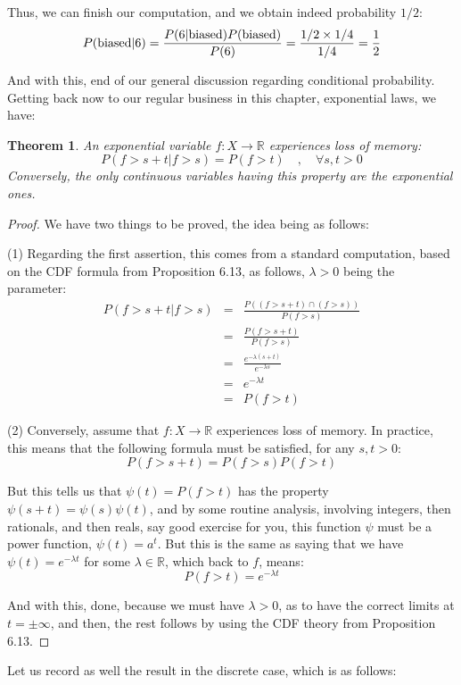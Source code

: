\documentclass[12pt]{amsbook}
\newtheorem{theorem}{Theorem}[chapter]
\begin{document}
Thus, we can finish our computation, and we obtain indeed probability $1/2$:
$$P({\rm biased}|6)
=\frac{P(6|{\rm biased})P({\rm biased})}{P(6)}
=\frac{1/2\times 1/4}{1/4}
=\frac{1}{2}$$

And with this, end of our general discussion regarding conditional probability. Getting back now to our regular business in this chapter, exponential laws, we have:

\begin{theorem}
An exponential variable $f:X\to\mathbb R$ experiences loss of memory:
$$P(f>s+t|f>s)=P(f>t)\quad,\quad\forall s,t>0$$
Conversely, the only continuous variables having this property are the exponential ones. 
\end{theorem}

\begin{proof}
We have two things to be proved, the idea being as follows:

\medskip

(1) Regarding the first assertion, this comes from a standard computation, based on the CDF formula from Proposition 6.13, as follows, $\lambda>0$ being the parameter:
\begin{eqnarray*}
P(f>s+t|f>s)
&=&\frac{P((f>s+t)\cap(f>s))}{P(f>s)}\\
&=&\frac{P(f>s+t)}{P(f>s)}\\
&=&\frac{e^{-\lambda(s+t)}}{e^{-\lambda s}}\\
&=&e^{-\lambda t}\\
&=&P(f>t)
\end{eqnarray*}

(2) Conversely, assume that $f:X\to\mathbb R$ experiences loss of memory. In practice, this means that the following formula must be satisfied, for any $s,t>0$:
$$P(f>s+t)=P(f>s)P(f>t)$$

But this tells us that $\psi(t)=P(f>t)$ has the property $\psi(s+t)=\psi(s)\psi(t)$, and by some routine analysis, involving integers, then rationals, and then reals, say good exercise for you, this function $\psi$ must be a power function, $\psi(t)=a^t$. But this is the same as saying that we have $\psi(t)=e^{-\lambda t}$ for some $\lambda\in\mathbb R$, which back to $f$, means:
$$P(f>t)=e^{-\lambda t}$$

And with this, done, because we must have $\lambda>0$, as to have the correct limits at $t=\pm\infty$, and then, the rest follows by using the CDF theory from Proposition 6.13.
\end{proof}

Let us record as well the result in the discrete case, which is as follows:
\end{document}
